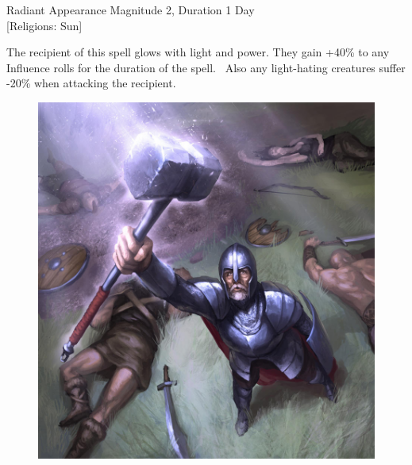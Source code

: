 \begin{rpg-spell}
{Radiant Appearance}
{Magnitude 2, Duration 1 Day\\{[Religions: Sun]}}

The recipient of this spell glows with light and power. They gain +40\% to any Influence rolls for the duration of the spell.  Also any light-hating creatures suffer -20\% when attacking the recipient. 
\end{rpg-spell}

\begin{figure}[h]
\begin{center}
\includegraphics[scale=0.26]{img/invigorate_card_by_sirend.jpg}
\end{center}
\end{figure}



